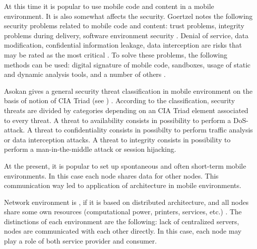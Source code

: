 %
At this time it is popular to use mobile code and content in a mobile environment. 
%
It is also somewhat affects the security. 
%
Goertzel notes the following security problems related to mobile code and content: trust problems, integrity problems during delivery, software environment security . 
%
Denial of service, data modification, confidential information leakage, data interception are risks that may be rated as the most critical . 
%
To solve these problems, the following methods can be used: digital signature of mobile code, sandboxes, usage of static and dynamic analysis tools, and a number of others    . 

%
Asokan gives a general security threat classification in mobile environment on the basis of notion of CIA Triad (see ) . 
%
According to the classification, security threats are divided by categories depending on an CIA Triad element associated to every threat. 
%
A threat to availability consists in possibility to perform a DoS-attack. 
%
A threat to confidentiality consists in possibilty to perform traffic analysis or data interception attacks. 
%
A threat to integrity consists in possibility to perform a man-in-the-middle attack or session hijacking. 

%
At the present, it is popular to set up spontaneous and often short-term mobile environments. 
%
In this case each node shares data for other nodes. 
%
This communication way led to application of  architecture in mobile environments. 



%
Network environment is , if it is based on distributed architecture, and all nodes share some own resources (computational power, printers, services, etc.) . 
%
The distinctions of each  environment are the following: lack of centralized servers, nodes are communicated with each other directly. 
%
In this case, each node may play a role of both service provider and consumer. 

